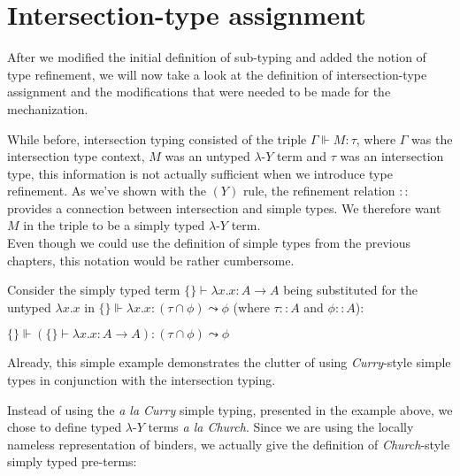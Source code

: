 \documentclass[a4paper, 12pt, twoside]{style/ociamthesis}
\theoremstyle{plain}
\theoremstyle{definition}
\newtheorem{Example}{Example}[chapter]
\theoremstyle{remark}
\newcommand{\lamy}{\lambda\text{-}Y}
\renewenvironment{Example}{\begin{OldExample}\begin{mdframed}[style=example, linecolor=yellow]}{\end{mdframed}\end{OldExample}}
\begin{document}
\section{Intersection-type
assignment}\label{intersection-type-assignment}

After we modified the initial definition of sub-typing and added the
notion of type refinement, we will now take a look at the definition of
intersection-type assignment and the modifications that were needed to
be made for the mechanization.

While before, intersection typing consisted of the triple
\(\Gamma \Vdash M : \tau\), where \(\Gamma\) was the intersection type
context, \(M\) was an untyped \(\lamy\) term and \(\tau\) was an
intersection type, this information is not actually sufficient when we
introduce type refinement. As we've shown with the \((Y)\) rule, the
refinement relation \(::\) provides a connection between intersection
and simple types. We therefore want \(M\) in the triple to be a simply
typed \(\lamy\) term.\\
Even though we could use the definition of simple types from the
previous chapters, this notation would be rather cumbersome.\\

\begin{Example}

Consider the simply typed term \(\{\} \vdash \lambda x.x : A \to A\)
being substituted for the untyped \(\lambda x.x\) in
\(\{\} \Vdash \lambda x.x : (\tau \cap \phi) \leadsto \phi\) (where
\(\tau :: A\) and \(\phi :: A\)):

\begin{center}
$\{\} \Vdash (\{\} \vdash \lambda x.x : A \to A) : (\tau \cap \phi) \leadsto \phi$
\end{center}

Already, this simple example demonstrates the clutter of using
\emph{Curry}-style simple types in conjunction with the intersection
typing.

\end{Example}

Instead of using the \emph{a la Curry} simple typing, presented in the
example above, we chose to define typed \(\lamy\) terms \emph{a la
Church}. Since we are using the locally nameless representation of
binders, we actually give the definition of \emph{Church}-style simply
typed pre-terms:
\end{document}
